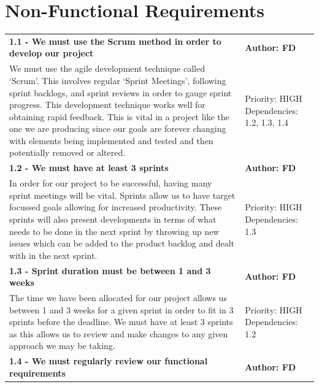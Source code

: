 \documentclass[11pt]{report}
\begin{document}
\section{Non-Functional Requirements}

\begin{center}

\begin{longtable}{| p{13cm} | p{3cm} |}
\endfirsthead
\endlastfoot

\multicolumn{2}{c}{\textit{Continued from last page}}
\endhead

\multicolumn{2}{c}{\textit{Continued on next page}}
\endfoot

\hline
\multicolumn{2}{|l|}{\textbf{\textit{1 - Software Development Process}}} \\
\hline
\textbf{1.1 - We must use the Scrum method in order to develop our project} & \textbf{Author: FD} \\
\hline
We must use the agile development technique called ‘Scrum’. This involves regular ‘Sprint Meetings’, following sprint backlogs, and sprint reviews in order to gauge sprint progress. This development technique works well for obtaining rapid feedback. This is vital in a project like the one we are producing since our goals are forever changing with elements being implemented and tested and then potentially removed or altered.&Priority: HIGH Dependencies: 1.2, 1.3, 1.4\\
\hline
\textbf{1.2 - We must have at least 3 sprints} & \textbf{Author: FD} \\
\hline
In order for our project to be successful, having many sprint meetings will be vital. Sprints allow us to have target focussed goals allowing for increased productivity. These sprints will also present developments in terms of what needs to be done in the next sprint by throwing up new issues which can be added to the product backlog and dealt with in the next sprint.&Priority: HIGH Dependencies: 1.3\\
\hline
\textbf{1.3 - Sprint duration must be between 1 and 3 weeks} & \textbf{Author: FD} \\
\hline
The time we have been allocated for our project allows us between 1 and 3 weeks for a given sprint in order to fit in 3 sprints before the deadline. We must have at least 3 sprints as this allows us to review and make changes to any given approach we may be taking.&Priority: HIGH Dependencies: 1.2\\
\hline
\textbf{1.4 - We must regularly review our functional requirements} & \textbf{Author: FD} \\

\end{longtable}
\end{center}
\end{document}
